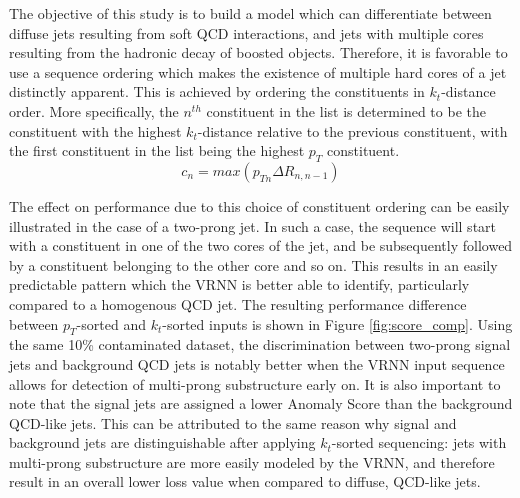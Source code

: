 \documentclass[12pt, a4paper]{article}
\begin{document}
The objective of this study is to build a model which can differentiate between diffuse jets resulting from soft QCD interactions, and jets with multiple cores resulting from the hadronic decay of boosted objects. Therefore, it is favorable to use a sequence ordering which makes the existence of multiple hard cores of a jet distinctly apparent. This is achieved by ordering the constituents in $k_{t}$-distance order. More specifically, the $n^{th}$ constituent in the list is determined to be the constituent with the highest $k_{t}$-distance relative to the previous constituent, with the first constituent in the list being the highest $p_{T}$ constituent.
\begin{equation}
	c_{n} = max(p_{Tn}\Delta R_{n, n-1})
\end{equation}

The effect on performance due to this choice of constituent ordering can be easily illustrated in the case of a two-prong jet. In such a case, the sequence will start with a constituent in one of the two cores of the jet, and be subsequently followed by a constituent belonging to the other core and so on. This results in an easily predictable pattern which the VRNN is better able to identify, particularly compared to a homogenous QCD jet. The resulting performance difference between $p_{T}$-sorted and $k_{t}$-sorted inputs is shown in Figure \ref{fig:score_comp}. Using the same 10\% contaminated dataset, the discrimination between two-prong signal jets and background QCD jets is notably better when the VRNN input sequence allows for detection of multi-prong substructure early on. It is also important to note that the signal jets are assigned a lower Anomaly Score than the background QCD-like jets. This can be attributed to the same reason why signal and background jets are distinguishable after applying $k_{t}$-sorted sequencing: jets with multi-prong substructure are more easily modeled by the VRNN, and therefore result in an overall lower loss value when compared to diffuse, QCD-like jets. 
\end{document}
